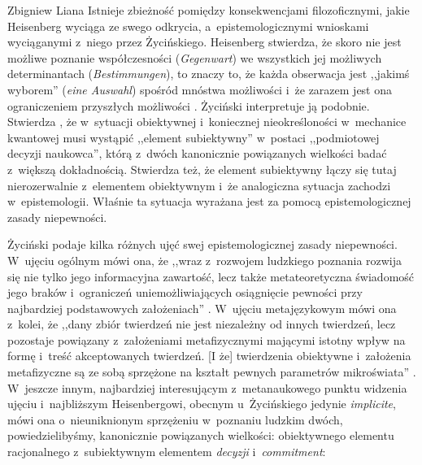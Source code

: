\begin{artplenv}{Zbigniew Liana}
\enlargethispage{-\baselineskip}
Istnieje zbieżność pomiędzy konsekwencjami filozoficznymi, jakie Heisenberg wyciąga ze swego odkrycia, a~epistemologicznymi wnioskami wyciąganymi z~niego przez Życińskiego. Heisenberg stwierdza, że skoro nie jest możliwe poznanie współczesności (\textit{Gegenwart}) we wszystkich jej możliwych determinantach (\textit{Bestimmungen}), to znaczy to, że każda obserwacja jest ,,jakimś wyborem'' (\textit{eine Auswahl}) spośród mnóstwa możliwości i~że zarazem jest ona ograniczeniem przyszłych możliwości
\parencite[][s.~197]{heisenberg_uber_1927}. %
 Życiński interpretuje ją podobnie. Stwierdza 
\parencite[][s.~159n]{zycinski_teizm_1985}, %
 że w~sytuacji obiektywnej i~koniecznej nieokreśloności w~mechanice kwantowej musi wystąpić ,,element subiektywny'' w~postaci ,,podmiotowej decyzji naukowca'', którą z~dwóch kanonicznie powiązanych wielkości badać z~większą dokładnością. Stwierdza też, że element subiektywny łączy się tutaj nierozerwalnie z~elementem obiektywnym i~że analogiczna sytuacja zachodzi w~epistemologii. Właśnie ta sytuacja wyrażana jest za pomocą epistemologicznej zasady niepewności.

\enlargethispage{-\baselineskip}
Życiński podaje kilka różnych ujęć swej epistemologicznej zasady niepewności. W~ujęciu ogólnym mówi ona, że ,,wraz z~rozwojem ludzkiego poznania rozwija się nie tylko jego informacyjna zawartość, lecz także metateoretyczna świadomość jego braków i~ograniczeń uniemożliwiających osiągnięcie pewności przy najbardziej podstawowych założeniach''
\parencite[][s.~159]{zycinski_teizm_1985}. %
 W~ujęciu metajęzykowym mówi ona z~kolei, że ,,dany zbiór twierdzeń nie jest niezależny od innych twierdzeń, lecz pozostaje powiązany z~założeniami metafizycznymi mającymi istotny wpływ na formę i~treść akceptowanych twierdzeń. [I że] twierdzenia obiektywne i~założenia metafizyczne są ze sobą sprzężone na kształt pewnych parametrów mikroświata'' 
\parencites[][s.~139]{zycinski_structure_1988}[][s.~246]{zycinski_struktura_2013_liana}. %
 W~jeszcze innym, najbardziej interesującym z~metanaukowego punktu widzenia ujęciu i~najbliższym Heisenbergowi, obecnym u~Życińskiego jedynie \textit{implicite}, mówi ona o~nieuniknionym sprzężeniu w~poznaniu ludzkim dwóch, powiedzielibyśmy, kanonicznie powiązanych wielkości: obiektywnego elementu racjonalnego z~subiektywnym elementem \textit{decyzji} i~\textit{commitment}:


\end{artplenv}
